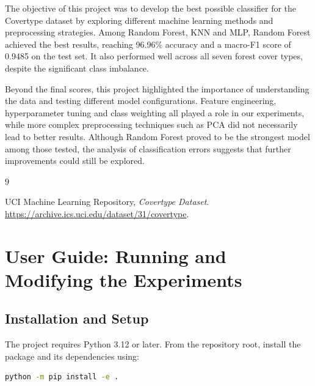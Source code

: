 \documentclass[10pt,a4paper]{article}
\begin{document}
The objective of this project was to develop the best possible
classifier for the Covertype dataset by exploring different
machine learning methods and preprocessing strategies.
Among Random Forest, KNN and MLP, Random Forest achieved
the best results, reaching 96.96\% accuracy and a macro-F1
score of 0.9485 on the test set. It also performed well
across all seven forest cover types, despite the significant
class imbalance.

Beyond the final scores, this project highlighted the
importance of understanding the data and testing different
model configurations. Feature engineering, hyperparameter
tuning and class weighting all played a role in our
experiments, while more complex preprocessing techniques
such as PCA did not necessarily lead to better results.
Although Random Forest proved to be the strongest model
among those tested, the analysis of classification errors
suggests that further improvements could still be explored.



\begin{thebibliography}{9}
\small

UCI Machine Learning Repository,
\emph{Covertype Dataset}.
\url{https://archive.ics.uci.edu/dataset/31/covertype}.



\end{thebibliography}



\clearpage
\section*{User Guide: Running and Modifying the Experiments}

\subsection*{Installation and Setup}

The project requires Python 3.12 or later. From the repository
root, install the package and its dependencies using:

\begin{lstlisting}[language=bash]
python -m pip install -e .
\end{lstlisting}
\end{document}
